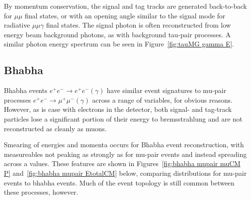 \documentclass[12pt]{thesis}  %
\begin{document}
By momentum conservation, the signal and tag tracks are generated back-to-back for $\mu\mu$ final states, or with an opening angle similar to the signal mode for radiative $\mu\mu\gamma$ final states. The signal photon is often reconstructed from low energy beam background photons, as with background tau-pair processes. A similar photon energy spectrum can be seen in Figure~\ref{fig:tauMG gamma E}.

\subsection{Bhabha}

Bhabha events $e^+ e^- \to e^+ e^- (\gamma)$ have similar event signatures to mu-pair processes $e^+ e^- \to \mu^+ \mu^- (\gamma)$ across a range of variables, for obvious reasons. However, as is case with electrons in the detector, both signal- and tag-track particles lose a significant portion of their energy to bremsstrahlung and are not reconstructed as cleanly as muons. 

Smearing of energies and momenta occurs for Bhabha event reconstruction, with measureables not peaking as strongly as for mu-pair events and instead spreading across a values. These features are shown in Figures~\ref{fig:bhabha mupair muCM P} and~\ref{fig:bhabha mupair EtotalCM} below, comparing distributions for mu-pair events to bhabha events. Much of the event topology is still common between these processes, however.
\end{document}
